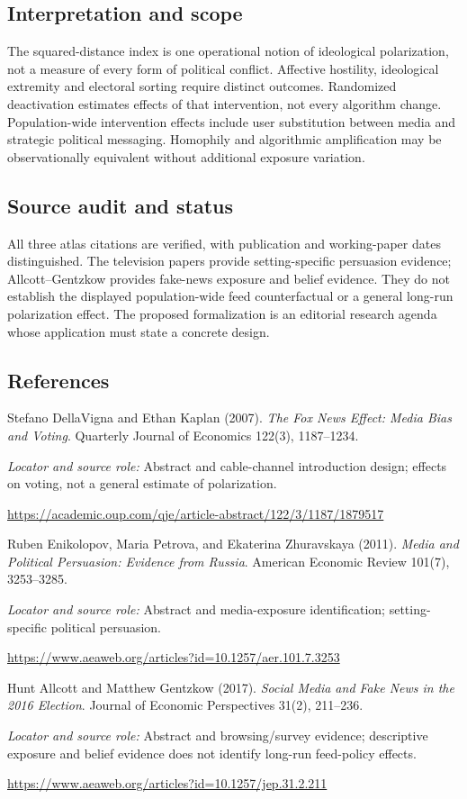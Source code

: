 \documentclass[11pt,a4paper]{article}
\begin{document}
\subsection*{Interpretation and scope}
The squared-distance index is one operational notion of ideological polarization, not a measure of every form of political conflict. Affective hostility, ideological extremity and electoral sorting require distinct outcomes. Randomized deactivation estimates effects of that intervention, not every algorithm change. Population-wide intervention effects include user substitution between media and strategic political messaging. Homophily and algorithmic amplification may be observationally equivalent without additional exposure variation.
\subsection*{Source audit and status}
All three atlas citations are verified, with publication and working-paper dates distinguished. The television papers provide setting-specific persuasion evidence; Allcott--Gentzkow provides fake-news exposure and belief evidence. They do not establish the displayed population-wide feed counterfactual or a general long-run polarization effect. The proposed formalization is an editorial research agenda whose application must state a concrete design.
\subsection*{References}
{\footnotesize\raggedright
\begin{enumerate}[label={\textbf{[S\arabic*]}},leftmargin=3em]
\item Stefano DellaVigna and Ethan Kaplan (2007). \emph{The Fox News Effect: Media Bias and Voting}. Quarterly Journal of Economics 122(3), 1187--1234.\par
\textit{Locator and source role:} Abstract and cable-channel introduction design; effects on voting, not a general estimate of polarization.\par
\url{https://academic.oup.com/qje/article-abstract/122/3/1187/1879517}
\item Ruben Enikolopov, Maria Petrova, and Ekaterina Zhuravskaya (2011). \emph{Media and Political Persuasion: Evidence from Russia}. American Economic Review 101(7), 3253--3285.\par
\textit{Locator and source role:} Abstract and media-exposure identification; setting-specific political persuasion.\par
\url{https://www.aeaweb.org/articles?id=10.1257/aer.101.7.3253}
\item Hunt Allcott and Matthew Gentzkow (2017). \emph{Social Media and Fake News in the 2016 Election}. Journal of Economic Perspectives 31(2), 211--236.\par
\textit{Locator and source role:} Abstract and browsing/survey evidence; descriptive exposure and belief evidence does not identify long-run feed-policy effects.\par
\url{https://www.aeaweb.org/articles?id=10.1257/jep.31.2.211}
\end{enumerate}
}
\end{document}
